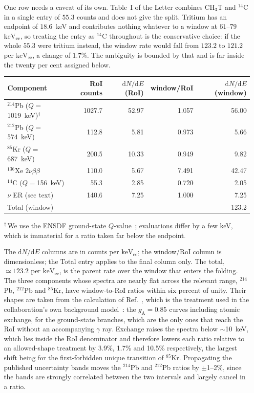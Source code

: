 \documentclass[11pt,a4paper]{article}
\newcommand{\keVee}{\ensuremath{\mathrm{keV_{ee}}}}
\begin{document}
One row needs a caveat of its own. Table~I of the Letter combines
\(\mathrm{CH_3T}\) and \(^{14}\)C in a single entry of \(55.3\) counts
and does not give the split. Tritium has an endpoint of \(18.6\)~keV and
contributes nothing whatever to a window at \(61\)--\(79\)~\keVee, so
treating the entry as \(^{14}\)C throughout is the conservative choice:
if the whole \(55.3\) were tritium instead, the window rate would fall
from \(123.2\) to \(121.2\) per \keVee, a change of \(1.7\%\). The
ambiguity is bounded by that and is far inside the twenty per cent
assigned below.

\begin{center}
\begin{tabular}{lrrrr}
\toprule
Component & RoI counts & \(\mathrm{d}N/\mathrm{d}E\) (RoI) & window/RoI & \(\mathrm{d}N/\mathrm{d}E\) (window)\\
\midrule
\(^{214}\)Pb (\(Q=\)\SI{1019}{keV})\(^{\dagger}\) & 1027.7 & 52.97 & 1.057 & 56.00\\
\(^{212}\)Pb (\(Q=\)\SI{574}{keV})  &  112.8 &  5.81 & 0.973 &  5.66\\
\(^{85}\)Kr  (\(Q=\)\SI{687}{keV})  &  200.5 & 10.33 & 0.949 &  9.82\\
\(^{136}\)Xe \(2\nu\beta\beta\) &  110.0 &  5.67 & 7.491 & 42.47\\
\(^{14}\)C   (\(Q=\)\SI{156}{keV})  &   55.3 &  2.85 & 0.720 &  2.05\\
\(\nu\) ER (see text)       &  140.6 &  7.25 & 1.000 &  7.25\\ \midrule
Total (window)            &      &      &      & 123.2\\ \bottomrule
\end{tabular} 
\end{center} 
\noindent\(^{\dagger}\)\,We use the ENSDF ground-state
\(Q\)-value~\cite{ENSDF}; evaluations differ by a few keV, which is
immaterial for a ratio taken far below the endpoint.

\noindent The \(\mathrm{d}N/\mathrm{d}E\) columns are in counts per
\keVee; the window/RoI column is dimensionless; the
Total entry applies to the final column only. The total, \(\simeq 123.2\) per
\keVee, is the parent rate over the window that enters
the folding. The three components whose spectra are nearly flat across
the relevant range, \(^{214}\)Pb, \(^{212}\)Pb and \(^{85}\)Kr, have
window-to-RoI ratios within six percent of unity. Their shapes are taken
from the calculation of Ref.~\cite{BetaShapes}, which is the treatment
used in the collaboration's own background model~\cite{Bkg}: the
\(g_\mathrm{A}=0.85\) curves including atomic exchange, for the
ground-state branches, which are the only ones that reach the RoI
without an accompanying \(\gamma\) ray. Exchange raises the spectra
below \(\sim\)\SI{10}{keV}, which lies inside the RoI denominator and
therefore lowers each ratio relative to an allowed-shape treatment by
3.9\%, 1.7\% and 10.5\% respectively, the largest shift being for the
first-forbidden unique transition of \(^{85}\)Kr. Propagating the
published uncertainty bands moves the \(^{214}\)Pb and \(^{212}\)Pb
ratios by \(\pm\)1--2\%, since the bands are strongly correlated between
the two intervals and largely cancel in a ratio. 
\end{document}

